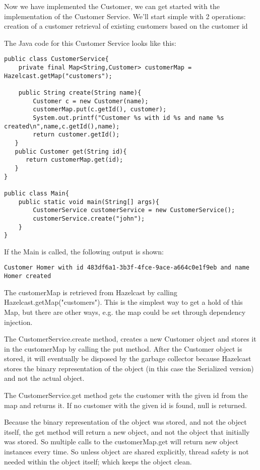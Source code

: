 Now we have implemented the Customer, we can get started with the implementation of the Customer Service. We'll start simple with 2 operations:
creation of a customer
retrieval of existing customers based on the customer id

The Java code for this Customer Service looks like this:

\begin{verbatim}
public class CustomerService{
    private final Map<String,Customer> customerMap = Hazelcast.getMap("customers");
    
    public String create(String name){
        Customer c = new Customer(name);
        customerMap.put(c.getId(), customer);
        System.out.printf("Customer %s with id %s and name %s created\n",name,c.getId(),name);
        return customer.getId();
   }
   public Customer get(String id){
      return customerMap.get(id);
   } 
}

public class Main{
	public static void main(String[] args){
		CustomerService customerService = new CustomerService();
		customerService.create("john");
	}
}
\end{verbatim}

If the Main is called,  the following output is shown:
\begin{verbatim}
Customer Homer with id 483df6a1-3b3f-4fce-9ace-a664c0e1f9eb and name Homer created
\end{verbatim}	

The customerMap is retrieved from Hazelcast by calling Hazelcast.getMap("customers"). This is the simplest way to get a hold of this Map, but there are other ways, e.g. the map could be set through dependency injection.

The CustomerService.create method, creates a new Customer object and stores it in the customerMap by calling the put method. After the Customer object is stored, it will eventually be disposed by the garbage collector because Hazelcast stores the binary representation of the object (in this case the Serialized version) and not the actual object.

The CustomerService.get method gets the customer with the given id from the map and returns it. If no customer with the given id is found, null is returned. 

Because the binary representation of the object was stored, and not the object itself, the get method will return a new object, and not the object that initially was stored. So multiple calls to the customerMap.get will return new object instances every time. So unless object are shared explicitly, thread safety is not needed within the object itself; which keeps the object clean.
 
